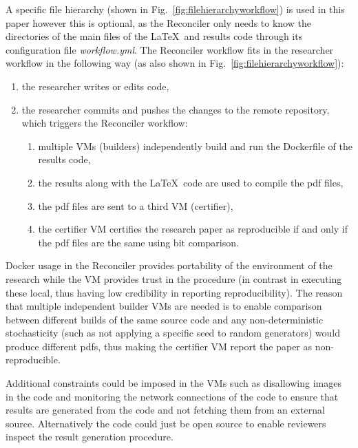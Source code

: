 \documentclass[journal]{IEEEtran}
\begin{document}
A specific file hierarchy (shown in Fig.~\ref{fig:filehierarchyworkflow}) is used in this paper however this is optional, as the Reconciler only needs to know the directories of the main files of the \LaTeX\ and results code through its configuration file \textit{workflow.yml}.
The Reconciler workflow fits in the researcher workflow in the following way (as also shown in Fig.~\ref{fig:filehierarchyworkflow}):
\begin{enumerate}
	\item the researcher writes or edits code,
	\item the researcher commits and pushes the changes to the remote repository, which triggers the Reconciler workflow:
		\begin{enumerate}
			\item multiple VMs (builders) independently build and run the Dockerfile of the results code,
			\item the results along with the \LaTeX\ code are used to compile the pdf files,
			\item the pdf files are sent to a third VM (certifier),
			\item the certifier VM certifies the research paper as reproducible if and only if the pdf files are the same using bit comparison.
		\end{enumerate}
\end{enumerate}

Docker usage in the Reconciler provides portability of the environment of the research while the VM provides trust in the procedure (in contrast in executing these local, thus having low credibility in reporting reproducibility).
The reason that multiple independent builder VMs are needed is to enable comparison between different builds of the same source code and any non-deterministic stochasticity (such as not applying a specific seed to random generators) would produce different pdfs, thus making the certifier VM report the paper as non-reproducible.

Additional constraints could be imposed in the VMs such as disallowing images in the code and monitoring the network connections of the code to ensure that results are generated from the code and not fetching them from an external source.
Alternatively the code could just be open source to enable reviewers inspect the result generation procedure.
\end{document}
